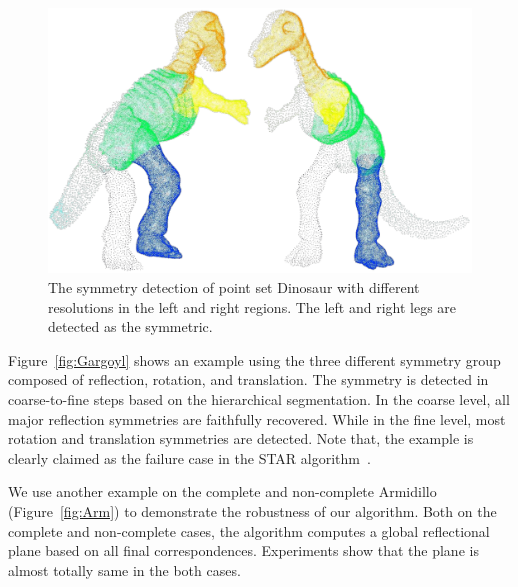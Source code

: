 \begin{figure}[t]
\centering
  \includegraphics[width=0.99\linewidth]{figures/dinosaur.pdf}
  \caption{The symmetry detection of point set Dinosaur with different resolutions in the left and right regions. The left and right legs are detected as the symmetric.}
\label{fig:Point}
\end{figure}

Figure~\ref{fig:Gargoyl} shows an example using the three different symmetry group composed of reflection, rotation, and translation.
The symmetry is detected in coarse-to-fine steps based on the hierarchical segmentation.
In the coarse level, all major reflection symmetries are faithfully recovered.
While in the fine level, most rotation and translation symmetries are detected.
Note that, the example is clearly claimed as the failure case in the STAR algorithm~\cite{berner2011}.

We use another example on the complete and non-complete Armidillo (Figure~\ref{fig:Arm}) to demonstrate the robustness of our algorithm.
Both on the complete and non-complete cases, the algorithm computes a global reflectional plane based on all final correspondences.
Experiments show that the plane is almost totally same in the both cases.

